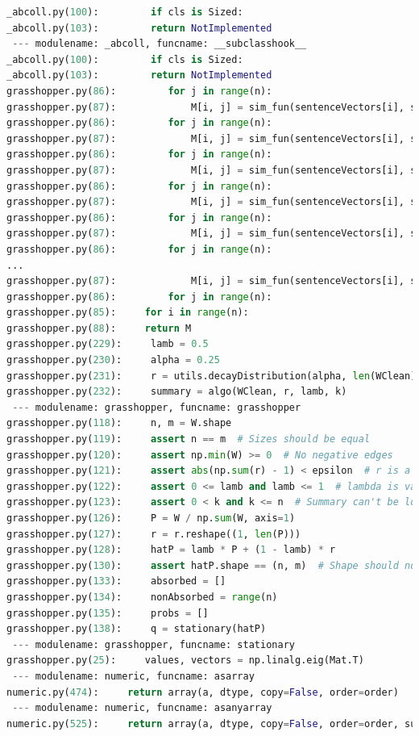 \documentclass[11pt]{article}
\begin{document}
\begin{lstlisting}[breaklines,language=Python]
_abcoll.py(100):         if cls is Sized:
_abcoll.py(103):         return NotImplemented
 --- modulename: _abcoll, funcname: __subclasshook__
_abcoll.py(100):         if cls is Sized:
_abcoll.py(103):         return NotImplemented
grasshopper.py(86):         for j in range(n):
grasshopper.py(87):             M[i, j] = sim_fun(sentenceVectors[i], sentenceVectors[j])
grasshopper.py(86):         for j in range(n):
grasshopper.py(87):             M[i, j] = sim_fun(sentenceVectors[i], sentenceVectors[j])
grasshopper.py(86):         for j in range(n):
grasshopper.py(87):             M[i, j] = sim_fun(sentenceVectors[i], sentenceVectors[j])
grasshopper.py(86):         for j in range(n):
grasshopper.py(87):             M[i, j] = sim_fun(sentenceVectors[i], sentenceVectors[j])
grasshopper.py(86):         for j in range(n):
grasshopper.py(87):             M[i, j] = sim_fun(sentenceVectors[i], sentenceVectors[j])
grasshopper.py(86):         for j in range(n):
...
grasshopper.py(87):             M[i, j] = sim_fun(sentenceVectors[i], sentenceVectors[j])
grasshopper.py(86):         for j in range(n):
grasshopper.py(85):     for i in range(n):
grasshopper.py(88):     return M
grasshopper.py(229):     lamb = 0.5
grasshopper.py(230):     alpha = 0.25
grasshopper.py(231):     r = utils.decayDistribution(alpha, len(WClean))
grasshopper.py(232):     summary = algo(WClean, r, lamb, k)
 --- modulename: grasshopper, funcname: grasshopper
grasshopper.py(118):     n, m = W.shape
grasshopper.py(119):     assert n == m  # Sizes should be equal
grasshopper.py(120):     assert np.min(W) >= 0  # No negative edges
grasshopper.py(121):     assert abs(np.sum(r) - 1) < epsilon  # r is a distribution
grasshopper.py(122):     assert 0 <= lamb and lamb <= 1  # lambda is valid
grasshopper.py(123):     assert 0 < k and k <= n  # Summary can't be longer than document!
grasshopper.py(126):     P = W / np.sum(W, axis=1)
grasshopper.py(127):     r = r.reshape((1, len(P)))
grasshopper.py(128):     hatP = lamb * P + (1 - lamb) * r
grasshopper.py(130):     assert hatP.shape == (n, m)  # Shape should not change!
grasshopper.py(133):     absorbed = []
grasshopper.py(134):     nonAbsorbed = range(n)
grasshopper.py(135):     probs = []
grasshopper.py(138):     q = stationary(hatP)
 --- modulename: grasshopper, funcname: stationary
grasshopper.py(25):     values, vectors = np.linalg.eig(Mat.T)
 --- modulename: numeric, funcname: asarray
numeric.py(474):     return array(a, dtype, copy=False, order=order)
 --- modulename: numeric, funcname: asanyarray
numeric.py(525):     return array(a, dtype, copy=False, order=order, subok=True)

\end{lstlisting}
\end{document}
